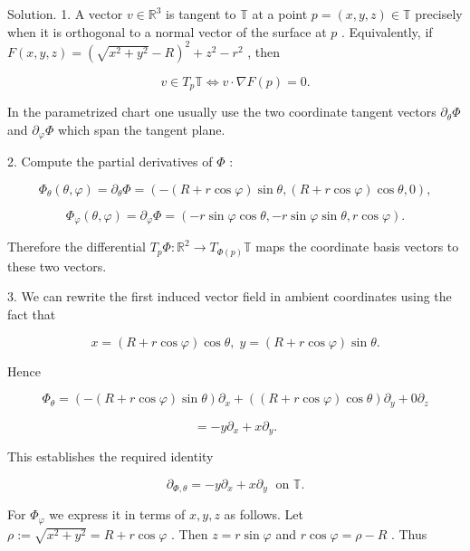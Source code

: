 \documentclass[10pt]{article}
\begin{document}
Solution. 1. A vector \(v \in  {\mathbb{R}}^{3}\) is tangent to \(\mathbb{T}\) at a point \(p = \left( {x,y,z}\right)  \in  \mathbb{T}\) precisely when it is orthogonal to a normal vector of the surface at \(p\) . Equivalently, if \(F\left( {x,y,z}\right)  = {\left( \sqrt{{x}^{2} + {y}^{2}} - R\right) }^{2} + {z}^{2} - {r}^{2}\) , then

\[
v \in  {T}_{p}\mathbb{T} \Leftrightarrow  v \cdot  \nabla F\left( p\right)  = 0.
\]

In the parametrized chart one usually use the two coordinate tangent vectors \({\partial }_{\theta }\Phi\) and \({\partial }_{\varphi }\Phi\) which span the tangent plane.

2. Compute the partial derivatives of \(\Phi\) :

\[
{\Phi }_{\theta }\left( {\theta ,\varphi }\right)  = {\partial }_{\theta }\Phi  = \left( {-\left( {R + r\cos \varphi }\right) \sin \theta ,\left( {R + r\cos \varphi }\right) \cos \theta ,0}\right) ,
\]

\[
{\Phi }_{\varphi }\left( {\theta ,\varphi }\right)  = {\partial }_{\varphi }\Phi  = \left( {-r\sin \varphi \cos \theta , - r\sin \varphi \sin \theta ,r\cos \varphi }\right) .
\]

Therefore the differential \({T}_{p}\Phi  : {\mathbb{R}}^{2} \rightarrow  {T}_{\Phi \left( p\right) }\mathbb{T}\) maps the coordinate basis vectors to these two vectors.

3. We can rewrite the first induced vector field in ambient coordinates using the fact that

\[
x = \left( {R + r\cos \varphi }\right) \cos \theta ,\;y = \left( {R + r\cos \varphi }\right) \sin \theta .
\]

Hence

\[
{\Phi }_{\theta } = \left( {-\left( {R + r\cos \varphi }\right) \sin \theta }\right) {\partial }_{x} + \left( {\left( {R + r\cos \varphi }\right) \cos \theta }\right) {\partial }_{y} + 0{\partial }_{z}
\]

\[
=  - y{\partial }_{x} + x{\partial }_{y}.
\]

This establishes the required identity

\[
{\partial }_{\Phi ,\theta } =  - y{\partial }_{x} + x{\partial }_{y}\;\text{ on }\mathbb{T}.
\]

For \({\Phi }_{\varphi }\) we express it in terms of \(x,y,z\) as follows. Let \(\rho  \mathrel{\text{ := }} \sqrt{{x}^{2} + {y}^{2}} = R + r\cos \varphi\) . Then \(z = r\sin \varphi\) and \(r\cos \varphi  = \rho  - R\) . Thus
\end{document}
